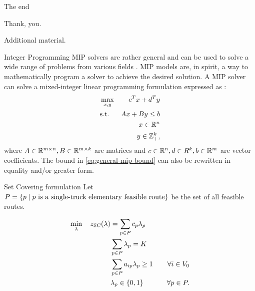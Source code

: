 \begin{frame}{The end}
	\begin{center}
		\begingroup
		\fontsize{18pt}{18pt}\selectfont
		Thank, you.
		\endgroup
	\end{center}
\end{frame}

\appendix

\begin{frame}
\end{frame}

\begin{frame}
	\begin{center}
		\begingroup
		\fontsize{18pt}{18pt}\selectfont
		Additional material.
		\endgroup
	\end{center}
\end{frame}

\begin{frame}{Integer Programming}
	MIP solvers are rather general and can be used to solve a wide range of problems from various fields \parencite{bixby2007progress}.
	MIP models are, in spirit, a way to mathematically program a solver to achieve the desired solution.
	A MIP solver can solve a mixed-integer linear programming formulation
	expressed as \parencite{wolsey1999integer}:
	\begin{align}
		 & \max_{x, y} & c^T x + d^T y                                 \\
		 & \text{s.t.} & A x + B y \le b  \label{eq:general-mip-bound} \\
		 &             & x \in \R^n                                    \\
		 &             & y \in \Z_{+}^k,
	\end{align}
	where $A \in \R^{m \times n}, B \in \R^{m \times k}$ are matrices and
	$c \in \R^n, d \in R^k, b \in \R^m$ are vector coefficients.
	The bound in \cref{eq:general-mip-bound} can also be rewritten in equality and/or greater form.

\end{frame}

\begin{frame}{Set Covering formulation}
	Let $P = \Set*{p \mid p\ \text{is a single-truck elementary feasible route}}$ be the set of all feasible routes.

	\begin{align}
		\min_{\lambda} \quad z_\mt{SC}(\lambda) & = \sum_{p \in P}  c_p \lambda_p              & \label{eq:set-covering-obj-func}                                                       \\
		                                        & \sum_{p \in P} \lambda_{p} = K               & \label{eq:set-covering-K-routes}                                                       \\
		                                        & \sum_{p \in P}  a_{ip} \lambda_p \ge 1       & \quad \forall i \in V_0 \label{eq:set-covering-customers-visited-by-exactly-one-route} \\
		                                        & \lambda_p                    \in \Set*{0, 1} & \quad \forall p \in P \label{eq:set-covering-lambda-mip-var-bounds}.
	\end{align}
\end{frame}

